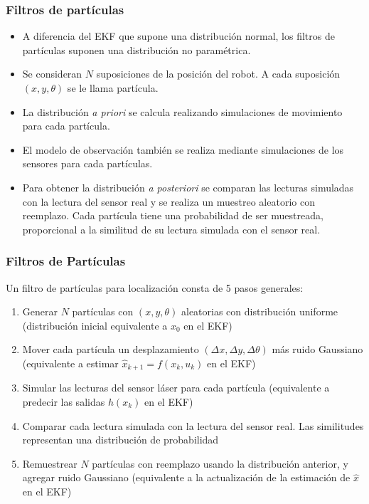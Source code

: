 \begin{frame}\frametitle{Filtros de partículas}
  \begin{itemize}
  \item A diferencia del EKF que supone una distribución normal, los filtros de partículas suponen una distribución no paramétrica.
  \item Se consideran $N$ suposiciones de la posición del robot. A cada suposición $(x,y,\theta)$ se le llama partícula. 
  \item La distribución \textit{a priori} se calcula realizando simulaciones de movimiento para cada partícula.
  \item El modelo de observación también se realiza mediante simulaciones de los sensores para cada partículas.
  \item Para obtener la distribución \textit{a posteriori} se comparan las lecturas simuladas con la lectura del sensor real y se realiza un muestreo aleatorio con reemplazo. Cada partícula tiene una probabilidad de ser muestreada, proporcional a la similitud de su lectura simulada con el sensor real.
  \end{itemize}
\end{frame}

\begin{frame}\frametitle{Filtros de Partículas}
  Un filtro de partículas para localización consta de 5 pasos generales:
  \begin{enumerate}
  \item Generar $N$ partículas con $(x,y,\theta)$ aleatorias con distribución uniforme (distribución inicial equivalente a $\hat{x}_0$ en el EKF)
  \item Mover cada partícula un desplazamiento $(\Delta x, \Delta y, \Delta\theta)$ más ruido Gaussiano (equivalente a estimar $\hat{x}_{k+1} = f(x_k, u_k)$ en el EKF)
  \item Simular las lecturas del sensor láser para cada partícula (equivalente a predecir las salidas $h(x_k)$ en el EKF)
  \item Comparar cada lectura simulada con la lectura del sensor real. Las similitudes representan una distribución de probabilidad 
  \item Remuestrear $N$ partículas con reemplazo usando la distribución anterior, y agregar ruido Gaussiano (equivalente a la actualización de la estimación de $\hat{x}$ en el EKF)
  \end{enumerate}
\end{frame}

